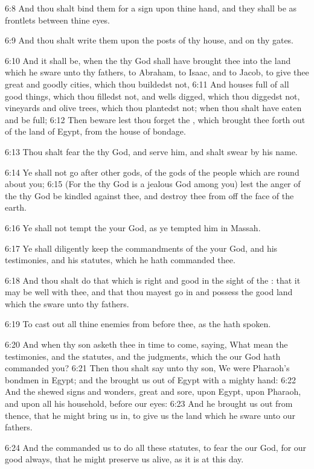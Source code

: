 6:8 And thou shalt bind them for a sign upon thine hand, and they shall be as frontlets between thine eyes.

6:9 And thou shalt write them upon the posts of thy house, and on thy gates.

6:10 And it shall be, when the \LORD thy God shall have brought thee into the land which he sware unto thy fathers, to Abraham, to Isaac, and to Jacob, to give thee great and goodly cities, which thou buildedst not, 6:11 And houses full of all good things, which thou filledst not, and wells digged, which thou diggedst not, vineyards and olive trees, which thou plantedst not; when thou shalt have eaten and be full; 6:12 Then beware lest thou forget the \LORD, which brought thee forth out of the land of Egypt, from the house of bondage.

6:13 Thou shalt fear the \LORD thy God, and serve him, and shalt swear by his name.

6:14 Ye shall not go after other gods, of the gods of the people which are round about you; 6:15 (For the \LORD thy God is a jealous God among you) lest the anger of the \LORD thy God be kindled against thee, and destroy thee from off the face of the earth.

6:16 Ye shall not tempt the \LORD your God, as ye tempted him in Massah.

6:17 Ye shall diligently keep the commandments of the \LORD your God, and his testimonies, and his statutes, which he hath commanded thee.

6:18 And thou shalt do that which is right and good in the sight of the \LORD: that it may be well with thee, and that thou mayest go in and possess the good land which the \LORD sware unto thy fathers.

6:19 To cast out all thine enemies from before thee, as the \LORD hath spoken.

6:20 And when thy son asketh thee in time to come, saying, What mean the testimonies, and the statutes, and the judgments, which the \LORD our God hath commanded you?  6:21 Then thou shalt say unto thy son, We were Pharaoh's bondmen in Egypt; and the \LORD brought us out of Egypt with a mighty hand: 6:22 And the \LORD shewed signs and wonders, great and sore, upon Egypt, upon Pharaoh, and upon all his household, before our eyes: 6:23 And he brought us out from thence, that he might bring us in, to give us the land which he sware unto our fathers.

6:24 And the \LORD commanded us to do all these statutes, to fear the \LORD our God, for our good always, that he might preserve us alive, as it is at this day.


